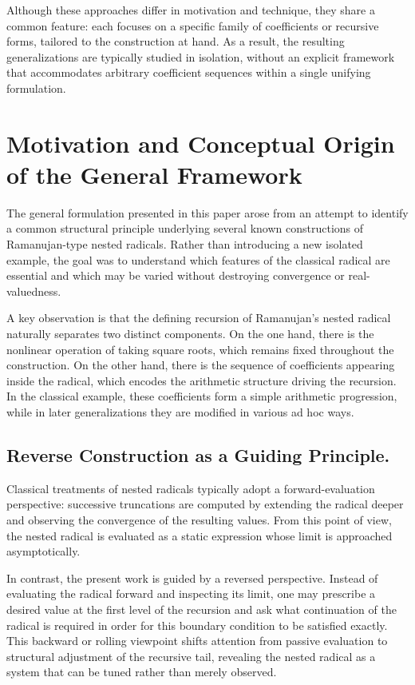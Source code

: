 \documentclass[11pt,a4paper]{amsart}
\theoremstyle{plain}
\theoremstyle{definition}
\theoremstyle{remark}
\begin{document}
Although these approaches differ in motivation and technique, they share a common feature: each focuses on a specific family of coefficients or recursive forms, tailored to the construction at hand. As a result, the resulting generalizations are typically studied in isolation, without an explicit framework that accommodates arbitrary coefficient sequences within a single unifying formulation.


\section{Motivation and Conceptual Origin of the General Framework}
\label{sec:motivation}

The general formulation presented in this paper arose from an attempt to identify a common structural principle underlying several known constructions of Ramanujan-type nested radicals. Rather than introducing a new isolated example, the goal was to understand which features of the classical radical are essential and which may be varied without destroying convergence or real-valuedness.

A key observation is that the defining recursion of Ramanujan’s nested radical naturally separates two distinct components. On the one hand, there is the nonlinear operation of taking square roots, which remains fixed throughout the construction. On the other hand, there is the sequence of coefficients appearing inside the radical, which encodes the arithmetic structure driving the recursion. In the classical example, these coefficients form a simple arithmetic progression, while in later generalizations they are modified in various ad hoc ways.

\subsection*{Reverse Construction as a Guiding Principle.}
Classical treatments of nested radicals typically adopt a forward-evaluation perspective: successive truncations are computed by extending the radical deeper and observing the convergence of the resulting values. From this point of view, the nested radical is evaluated as a static expression whose limit is approached asymptotically.

In contrast, the present work is guided by a reversed perspective. Instead of evaluating the radical forward and inspecting its limit, one may prescribe a desired value at the first level of the recursion and ask what continuation of the radical is required in order for this boundary condition to be satisfied exactly. This backward or rolling viewpoint shifts attention from passive evaluation to structural adjustment of the recursive tail, revealing the nested radical as a system that can be tuned rather than merely observed.
\end{document}
